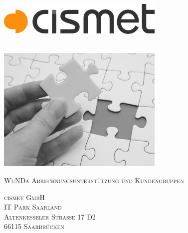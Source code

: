 \begin{titlepage}
\AddToShipoutPicture*{\BackgroundPic}
\hfill
\begin{minipage}[t]{0.5\textwidth}
	\begin{flushright}
	\includegraphics[width=\textwidth]{preamble/img/logo_cismet_grey}
	\end{flushright}
\end{minipage}
~\\[1cm]
\includegraphics[width=0.6\textwidth]{preamble/img/puzzleGrey}
~\\[1cm]

\begin{flushright}
\textsc{\Large WuNDa Abrechnungsunterstützung und Kundengruppen}

\vfill

\textsc{cismet GmbH}
\\[0.5cm]
\textsc{IT Park Saarland}\\
\textsc{Altenkesseler Straße 17 D2}\\
\textsc{66115 Saarbrücken}\\
\end{flushright}


\end{titlepage}
\restoregeometry

